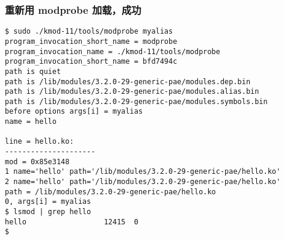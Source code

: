 \documentclass[11pt,a4paper]{article}
\begin{document}
\subsubsection{重新用 modprobe 加载，成功}

{\begin{shaded}\begin{verbatim}
$ sudo ./kmod-11/tools/modprobe myalias
program_invocation_short_name = modprobe
program_invocation_name = ./kmod-11/tools/modprobe
program_invocation_short_name = bfd7494c
path is quiet
path is /lib/modules/3.2.0-29-generic-pae/modules.dep.bin
path is /lib/modules/3.2.0-29-generic-pae/modules.alias.bin
path is /lib/modules/3.2.0-29-generic-pae/modules.symbols.bin
before options args[i] = myalias
name = hello

line = hello.ko:
---------------------
mod = 0x85e3148
1 name='hello' path='/lib/modules/3.2.0-29-generic-pae/hello.ko'
2 name='hello' path='/lib/modules/3.2.0-29-generic-pae/hello.ko'
path = /lib/modules/3.2.0-29-generic-pae/hello.ko
0, args[i] = myalias
$ lsmod | grep hello
hello                  12415  0 
$ 
\end{verbatim}\end{shaded}}
\end{document}
